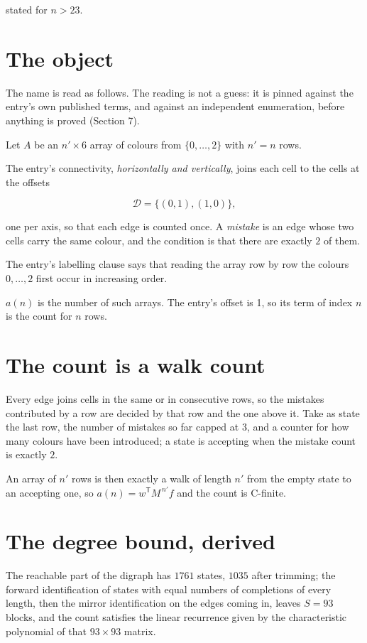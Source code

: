 \documentclass[11pt]{article}
\theoremstyle{definition}
\begin{document}
stated for $n > 23$.

\section{The object}

The name is read as follows. The reading is not a guess: it is pinned against the entry's own published terms, and against an independent enumeration, before anything is proved (Section 7).

Let $A$ be an $n' \times 6$ array of colours from $\{0,\dots,2\}$ with $n' = n$ rows.

The entry's connectivity, {\itshape horizontally and vertically}, joins each cell to the cells at the offsets

\[\mathcal{D} = \{(0,1), (1,0)\},\]

one per axis, so that each edge is counted once. A {\itshape mistake} is an edge whose two cells carry the same colour, and the condition is that there are exactly $2$ of them.

The entry's labelling clause says that reading the array row by row the colours $0,\dots,2$ first occur in increasing order.

$a(n)$ is the number of such arrays. The entry's offset is 1, so its term of index $n$ is the count for $n$ rows.

\section{The count is a walk count}

Every edge joins cells in the same or in consecutive rows, so the mistakes contributed by a row are decided by that row and the one above it. Take as state the last row, the number of mistakes so far capped at $3$, and a counter for how many colours have been introduced; a state is accepting when the mistake count is exactly $2$.

An array of $n'$ rows is then exactly a walk of length $n'$ from the empty state to an accepting one, so $a(n) = w^{\mathsf T}M^{\,n'}f$ and the count is C-finite.

\section{The degree bound, derived}

The reachable part of the digraph has $1761$ states, $1035$ after trimming; the forward identification of states with equal numbers of completions of every length, then the mirror identification on the edges coming in, leaves $S = 93$ blocks, and the count satisfies the linear recurrence given by the characteristic polynomial of that $93\times93$ matrix.
\end{document}

